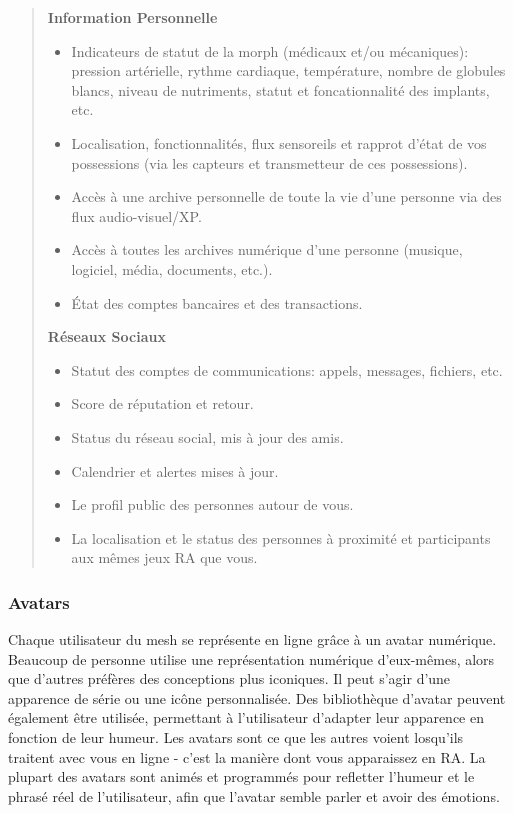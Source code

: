 \begin{quotation}
\noindent \textbf{Information Personnelle} \begin{itemize} \item Indicateurs de statut de la morph (médicaux et/ou mécaniques): pression artérielle, rythme cardiaque, température, nombre de globules blancs, niveau de nutriments, statut et foncationnalité des implants, etc. \item Localisation, fonctionnalités, flux sensoreils et rapprot d'état de vos possessions (via les capteurs et transmetteur de ces possessions). \item Accès à une archive personnelle de toute la vie d'une personne via des flux audio-visuel/XP. \item Accès à toutes les archives numérique d'une personne (musique, logiciel, média, documents, etc.). \item État des comptes bancaires et des transactions. \end{itemize} 

\noindent \textbf{Réseaux Sociaux} \begin{itemize} \item Statut des comptes de communications: appels, messages, fichiers, etc. \item Score de réputation et retour. \item Status du réseau social, mis à jour des amis. \item Calendrier et alertes mises à jour. \item Le profil public des personnes autour de vous. \item La localisation et le status des personnes à proximité et participants aux mêmes jeux RA que vous. \end{itemize} \end{quotation} 



\subsubsection{Avatars} 

Chaque utilisateur du mesh se représente en ligne grâce à un avatar numérique. Beaucoup de personne utilise une représentation numérique d'eux-mêmes, alors que d'autres préfères des conceptions plus iconiques. Il peut s'agir d'une apparence de série ou une icône personnalisée. Des bibliothèque d'avatar peuvent également être utilisée, permettant à l'utilisateur d'adapter leur apparence en fonction de leur humeur. Les avatars sont ce que les autres voient losqu'ils traitent avec vous en ligne - c'est la manière dont vous apparaissez en RA. La plupart des avatars sont animés et programmés pour refletter l'humeur et le phrasé réel de l'utilisateur, afin que l'avatar semble parler et avoir des émotions. 

